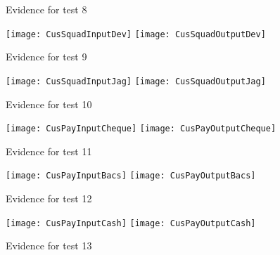 \documentclass[
11pt, %
a4paper, %
oneside, %
headinclude,footinclude, %
BCOR5mm, %
]{scrartcl}
\begin{document}
\begin{appendices}
{{{{{{{{{{{{{{\begin{figure}[H]
	\caption[Evidence C.1.1 Test 8]{Evidence for test 8}
	\label{cusdettes8}
\end{figure}
\begin{figure}[H]
	\centering
	\texttt{[image: CusSquadInputDev]}
	\texttt{[image: CusSquadOutputDev]}
	\caption[Evidence C.1.1 Test 9]{Evidence for test 9}
	\label{cusdettes9}
\end{figure}
\begin{figure}[H]
	\centering
	\texttt{[image: CusSquadInputJag]}
	\texttt{[image: CusSquadOutputJag]}
	\caption[Evidence C.1.1 Test 10]{Evidence for test 10}
	\label{cusdettes10}
\end{figure}
\begin{figure}[H]
	\centering
	\texttt{[image: CusPayInputCheque]}
	\texttt{[image: CusPayOutputCheque]}
	\caption[Evidence C.1.1 Test 11]{Evidence for test 11}
	\label{cusdettes11}	
\end{figure}
\begin{figure}[H]
	\centering
	\texttt{[image: CusPayInputBacs]}
	\texttt{[image: CusPayOutputBacs]}
	\caption[Evidence C.1.1 Test 12]{Evidence for test 12}
	\label{cusdettes12}	
\end{figure}
\begin{figure}[H]
	\centering
	\texttt{[image: CusPayInputCash]}
	\texttt{[image: CusPayOutputCash]}
	\caption[Evidence C.1.1 Test 13]{Evidence for test 13}
	\label{cusdettes13}	
\end{figure}
}}}}}}}}}}}}}}
\end{appendices}
\end{document}
